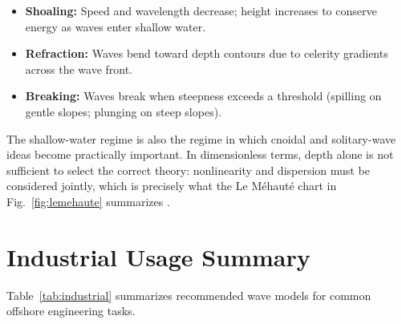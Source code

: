 \documentclass[journal,10pt,twocolumn]{IEEEtran}
\begin{document}
\begin{itemize}
  \item \textbf{Shoaling:} Speed and wavelength decrease; height increases to conserve
    energy as waves enter shallow water.
  \item \textbf{Refraction:} Waves bend toward depth contours due to celerity gradients
    across the wave front.
  \item \textbf{Breaking:} Waves break when steepness exceeds a threshold (spilling on
    gentle slopes; plunging on steep slopes).
\end{itemize}

The shallow-water regime is also the regime in which cnoidal and solitary-wave ideas
become practically important.
In dimensionless terms, depth alone is not sufficient to select the correct theory:
nonlinearity and dispersion must be considered jointly, which is precisely what the
Le M\'ehaut\'e chart in Fig.~\ref{fig:lemehaute} summarizes \cite{LeMehaute1976,Zhao2024}.

\section{Industrial Usage Summary}
\label{sec:industrial}

Table~\ref{tab:industrial} summarizes recommended wave models for common offshore
engineering tasks.
\end{document}

